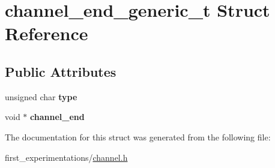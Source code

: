\hypertarget{structchannel__end__generic__t}{\section{channel\-\_\-end\-\_\-generic\-\_\-t Struct Reference}
\label{structchannel__end__generic__t}
}
\subsection*{Public Attributes}
\begin{DoxyCompactItemize}
\item 
\hypertarget{structchannel__end__generic__t_a0f1124e61811509f41d974b1df7a3bfc}{unsigned char {\bfseries type}}\label{structchannel__end__generic__t_a0f1124e61811509f41d974b1df7a3bfc}

\item 
\hypertarget{structchannel__end__generic__t_aef84ec65d166ccf7a193fa19bcb052a1}{void $\ast$ {\bfseries channel\-\_\-end}}\label{structchannel__end__generic__t_aef84ec65d166ccf7a193fa19bcb052a1}

\end{DoxyCompactItemize}


The documentation for this struct was generated from the following file\-:\begin{DoxyCompactItemize}
\item 
first\-\_\-experimentations/\hyperlink{channel_8h}{channel.\-h}\end{DoxyCompactItemize}
